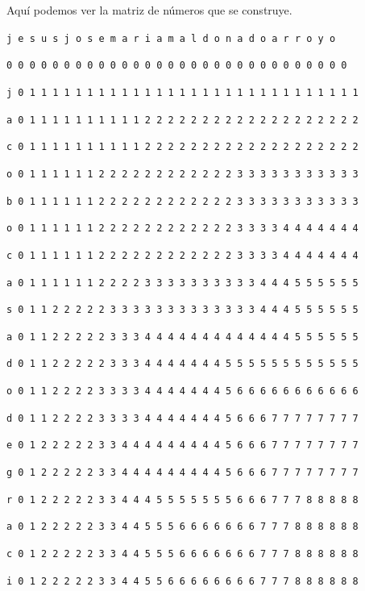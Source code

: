 \documentclass[11pt,a4paper]{article} %
\begin{document}
Aquí podemos ver la matriz de números que se construye.\\

\small

\hspace{1,72 em} \texttt{j e s u s j o s e m a r i a m a l d o n a d o a r r o y o}

\hspace{0,71 em} \texttt{0 0 0 0 0 0 0 0 0 0 0 0 0 0 0 0 0 0 0 0 0 0 0 0 0 0 0 0 0 0}

\texttt{j 0 1 1 1 1 1 1 1 1 1 1 1 1 1 1 1 1 1 1 1 1 1 1 1 1 1 1 1 1 1}

\texttt{a 0 1 1 1 1 1 1 1 1 1 1 2 2 2 2 2 2 2 2 2 2 2 2 2 2 2 2 2 2 2}

\texttt{c 0 1 1 1 1 1 1 1 1 1 1 2 2 2 2 2 2 2 2 2 2 2 2 2 2 2 2 2 2 2}

\texttt{o 0 1 1 1 1 1 1 2 2 2 2 2 2 2 2 2 2 2 2 3 3 3 3 3 3 3 3 3 3 3}

\texttt{b 0 1 1 1 1 1 1 2 2 2 2 2 2 2 2 2 2 2 2 3 3 3 3 3 3 3 3 3 3 3}

\texttt{o 0 1 1 1 1 1 1 2 2 2 2 2 2 2 2 2 2 2 2 3 3 3 3 4 4 4 4 4 4 4}

\texttt{c 0 1 1 1 1 1 1 2 2 2 2 2 2 2 2 2 2 2 2 3 3 3 3 4 4 4 4 4 4 4}

\texttt{a 0 1 1 1 1 1 1 2 2 2 2 3 3 3 3 3 3 3 3 3 3 4 4 4 5 5 5 5 5 5}

\texttt{s 0 1 1 2 2 2 2 2 3 3 3 3 3 3 3 3 3 3 3 3 3 4 4 4 5 5 5 5 5 5}

\texttt{a 0 1 1 2 2 2 2 2 3 3 3 4 4 4 4 4 4 4 4 4 4 4 4 4 5 5 5 5 5 5}

\texttt{d 0 1 1 2 2 2 2 2 3 3 3 4 4 4 4 4 4 4 5 5 5 5 5 5 5 5 5 5 5 5}

\texttt{o 0 1 1 2 2 2 2 3 3 3 3 4 4 4 4 4 4 4 5 6 6 6 6 6 6 6 6 6 6 6}

\texttt{d 0 1 1 2 2 2 2 3 3 3 3 4 4 4 4 4 4 4 5 6 6 6 7 7 7 7 7 7 7 7}

\texttt{e 0 1 2 2 2 2 2 3 3 4 4 4 4 4 4 4 4 4 5 6 6 6 7 7 7 7 7 7 7 7}

\texttt{g 0 1 2 2 2 2 2 3 3 4 4 4 4 4 4 4 4 4 5 6 6 6 7 7 7 7 7 7 7 7}

\texttt{r 0 1 2 2 2 2 2 3 3 4 4 4 5 5 5 5 5 5 5 6 6 6 7 7 7 8 8 8 8 8}

\texttt{a 0 1 2 2 2 2 2 3 3 4 4 5 5 5 6 6 6 6 6 6 6 7 7 7 8 8 8 8 8 8}

\texttt{c 0 1 2 2 2 2 2 3 3 4 4 5 5 5 6 6 6 6 6 6 6 7 7 7 8 8 8 8 8 8}

\texttt{i 0 1 2 2 2 2 2 3 3 4 4 5 5 6 6 6 6 6 6 6 6 7 7 7 8 8 8 8 8 8}
\end{document}
